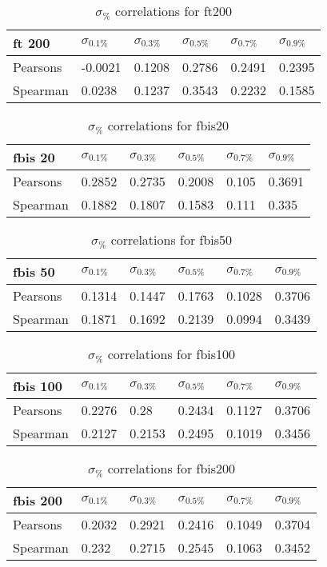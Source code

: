 \documentclass{sig-alternate}
\begin{document}
\begin{table}[h!]
\centering
\caption{$\sigma_{\%}$ correlations for ft200}
\begin{tabular}{|l|l|l|l|l|l|}
\hline
ft 200 & $\sigma_{0.1\%}$ & $\sigma_{0.3\%}$ & $\sigma_{0.5\%}$ & $\sigma_{0.7\%}$ & $\sigma_{0.9\%}$ \\ \hline
Pearsons  & -0.0021 & 0.1208 & 0.2786 & 0.2491 & 0.2395 \\ \hline
Spearman  & 0.0238 & 0.1237 & 0.3543 & 0.2232 & 0.1585 \\ \hline
\end{tabular}
\end{table}
\begin{table}[h!]
\centering
\caption{$\sigma_{\%}$ correlations for fbis20}
\begin{tabular}{|l|l|l|l|l|l|}
\hline
fbis 20 & $\sigma_{0.1\%}$ & $\sigma_{0.3\%}$ & $\sigma_{0.5\%}$ & $\sigma_{0.7\%}$ & $\sigma_{0.9\%}$ \\ \hline
Pearsons  & 0.2852 & 0.2735 & 0.2008 & 0.105 & 0.3691 \\ \hline
Spearman  & 0.1882 & 0.1807 & 0.1583 & 0.111 & 0.335 \\ \hline
\end{tabular}
\end{table}
\begin{table}[h!]
\centering
\caption{$\sigma_{\%}$ correlations for fbis50}
\begin{tabular}{|l|l|l|l|l|l|}
\hline
fbis 50 & $\sigma_{0.1\%}$ & $\sigma_{0.3\%}$ & $\sigma_{0.5\%}$ & $\sigma_{0.7\%}$ & $\sigma_{0.9\%}$ \\ \hline
Pearsons  & 0.1314 & 0.1447 & 0.1763 & 0.1028 & 0.3706 \\ \hline
Spearman  & 0.1871 & 0.1692 & 0.2139 & 0.0994 & 0.3439 \\ \hline
\end{tabular}
\end{table}
\begin{table}[h!]
\centering
\caption{$\sigma_{\%}$ correlations for fbis100}
\begin{tabular}{|l|l|l|l|l|l|}
\hline
fbis 100 & $\sigma_{0.1\%}$ & $\sigma_{0.3\%}$ & $\sigma_{0.5\%}$ & $\sigma_{0.7\%}$ & $\sigma_{0.9\%}$ \\ \hline
Pearsons  & 0.2276 & 0.28 & 0.2434 & 0.1127 & 0.3706 \\ \hline
Spearman  & 0.2127 & 0.2153 & 0.2495 & 0.1019 & 0.3456 \\ \hline
\end{tabular}
\end{table}
\begin{table}[h!]
\centering
\caption{$\sigma_{\%}$ correlations for fbis200}
\begin{tabular}{|l|l|l|l|l|l|}
\hline
fbis 200 & $\sigma_{0.1\%}$ & $\sigma_{0.3\%}$ & $\sigma_{0.5\%}$ & $\sigma_{0.7\%}$ & $\sigma_{0.9\%}$ \\ \hline
Pearsons  & 0.2032 & 0.2921 & 0.2416 & 0.1049 & 0.3704 \\ \hline
Spearman  & 0.232 & 0.2715 & 0.2545 & 0.1063 & 0.3452 \\ \hline
\end{tabular}
\end{table}
\end{document}
